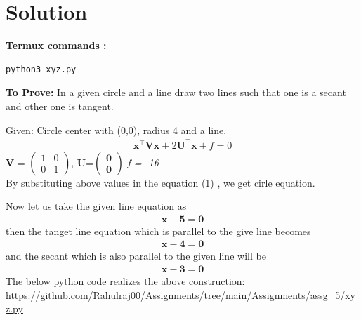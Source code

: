 \documentclass[10pt, a4paper]{article}
\let\vec\mathbf
\begin{document}
   \section{Solution}

\vspace{1mm}
\textbf{Termux commands :}
\begin{lstlisting}
python3 xyz.py
\end{lstlisting}


\vspace{.25 cm}
\textbf{To Prove:}
In a given circle and a line draw two lines such that one is a secant and other one is tangent. 

 Given:
Circle center with (0,0), radius 4 and a line. \\
\begin{align}
\vec{x}^{\top}\vec{V}\vec{x}+2\vec{U}^{\top}\vec{x}+f=0
\end{align}	
$\vec{V}$ = $\begin{pmatrix}
 1 & 0\\
 0 & 1
 \end{pmatrix}$,
 $\vec{U}$=$\vec{\begin{pmatrix}0 \\0 \end{pmatrix}}$
 \textit{f = -16}\\
 By substituting above values in the equation (1) ,
 we get cirle equation.

Now let us take the given line equation as\\
\begin{align}
\vec{ x-5 = 0}
\end{align}
then the tanget line equation which is parallel to the give line becomes
\begin{align}
\vec {x-4 = 0}
\end{align}
and the secant which is also parallel to the given line will be
\begin{align}
\vec {x-3 = 0} 
\end{align}
\vspace{1mm}
The below python code realizes the above construction:	\\
\url{https://github.com/Rahulraj00/Assignments/tree/main/Assignments/assg_5/xyz.py}

\end{document}
